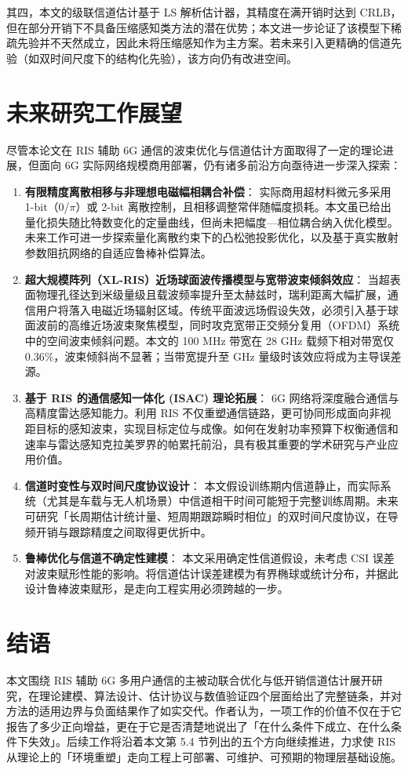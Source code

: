 其四，本文的级联信道估计基于 LS 解析估计器，其精度在满开销时达到 CRLB，但在部分开销下不具备压缩感知类方法的潜在优势；本文进一步论证了该模型下稀疏先验并不天然成立，因此未将压缩感知作为主方案。若未来引入更精确的信道先验（如双时间尺度下的结构化先验），该方向仍有改进空间。

\section{未来研究工作展望}

尽管本论文在 RIS 辅助 6G 通信的波束优化与信道估计方面取得了一定的理论进展，但面向 6G 实际网络规模商用部署，仍有诸多前沿方向亟待进一步深入探索：

\begin{enumerate}
  \item \textbf{有限精度离散相移与非理想电磁幅相耦合补偿}：
  实际商用超材料微元多采用 1-bit（0/$\pi$）或 2-bit 离散控制，且相移调整常伴随幅度损耗。本文虽已给出量化损失随比特数变化的定量曲线，但尚未把幅度—相位耦合纳入优化模型。未来工作可进一步探索量化离散约束下的凸松弛投影优化，以及基于真实散射参数阻抗网络的自适应鲁棒补偿算法。

  \item \textbf{超大规模阵列（XL-RIS）近场球面波传播模型与宽带波束倾斜效应}：
  当超表面物理孔径达到米级量级且载波频率提升至太赫兹时，瑞利距离大幅扩展，通信用户将落入电磁近场辐射区域。传统平面波远场假设失效，必须引入基于球面波前的高维近场波束聚焦模型，同时攻克宽带正交频分复用（OFDM）系统中的空间波束倾斜问题。本文的 100 MHz 带宽在 28 GHz 载频下相对带宽仅 0.36\%，波束倾斜尚不显著；当带宽提升至 GHz 量级时该效应将成为主导误差源。

  \item \textbf{基于 RIS 的通信感知一体化 (ISAC) 理论拓展}：
  6G 网络将深度融合通信与高精度雷达感知能力。利用 RIS 不仅重塑通信链路，更可协同形成面向非视距目标的感知波束，实现目标定位与成像。如何在发射功率预算下权衡通信和速率与雷达感知克拉美罗界的帕累托前沿，具有极其重要的学术研究与产业应用价值。

  \item \textbf{信道时变性与双时间尺度协议设计}：
  本文假设训练期内信道静止，而实际系统（尤其是车载与无人机场景）中信道相干时间可能短于完整训练周期。未来可研究「长周期估计统计量、短周期跟踪瞬时相位」的双时间尺度协议，在导频开销与跟踪精度之间取得更优折中。

  \item \textbf{鲁棒优化与信道不确定性建模}：
  本文采用确定性信道假设，未考虑 CSI 误差对波束赋形性能的影响。将信道估计误差建模为有界椭球或统计分布，并据此设计鲁棒波束赋形，是走向工程实用必须跨越的一步。
\end{enumerate}

\section{结语}

本文围绕 RIS 辅助 6G 多用户通信的主被动联合优化与低开销信道估计展开研究，在理论建模、算法设计、估计协议与数值验证四个层面给出了完整链条，并对方法的适用边界与负面结果作了如实交代。作者认为，一项工作的价值不仅在于它报告了多少正向增益，更在于它是否清楚地说出了「在什么条件下成立、在什么条件下失效」。后续工作将沿着本文第 5.4 节列出的五个方向继续推进，力求使 RIS 从理论上的「环境重塑」走向工程上可部署、可维护、可预期的物理层基础设施。
